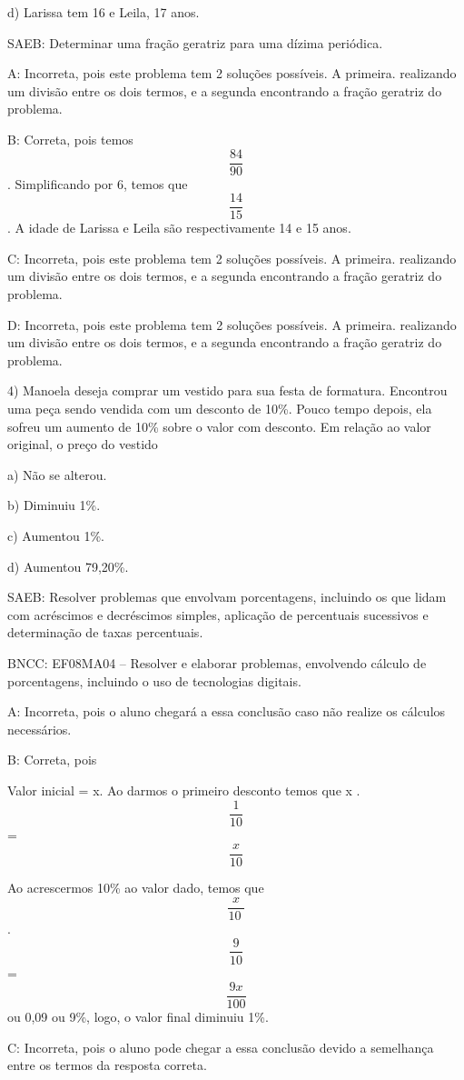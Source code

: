 d) Larissa tem 16 e Leila, 17 anos.

SAEB: Determinar uma fração geratriz para uma dízima periódica.

A: Incorreta, pois este problema tem 2 soluções possíveis. A primeira.
realizando um divisão entre os dois termos, e a segunda encontrando a
fração geratriz do problema.

B: Correta, pois temos \[\frac{84}{90}\]. Simplificando por 6, temos que
\[\frac{14}{15}\]. A idade de Larissa e Leila são respectivamente 14 e
15 anos.

C: Incorreta, pois este problema tem 2 soluções possíveis. A primeira.
realizando um divisão entre os dois termos, e a segunda encontrando a
fração geratriz do problema.

D: Incorreta, pois este problema tem 2 soluções possíveis. A primeira.
realizando um divisão entre os dois termos, e a segunda encontrando a
fração geratriz do problema.

4) Manoela deseja comprar um vestido para sua festa de formatura.
Encontrou uma peça sendo vendida com um desconto de 10\%. Pouco tempo
depois, ela sofreu um aumento de 10\% sobre o valor com desconto. Em
relação ao valor original, o preço do vestido

a) Não se alterou.

b) Diminuiu 1\%.

c) Aumentou 1\%.

d) Aumentou 79,20\%.

SAEB: Resolver problemas que envolvam porcentagens, incluindo os que
lidam com acréscimos e decréscimos simples, aplicação de percentuais
sucessivos e determinação de taxas percentuais.

BNCC: EF08MA04 -- Resolver e elaborar problemas, envolvendo cálculo de
porcentagens, incluindo o uso de tecnologias digitais.

A: Incorreta, pois o aluno chegará a essa conclusão caso não realize os
cálculos necessários.

B: Correta, pois

Valor inicial = x. Ao darmos o primeiro desconto temos que x .
\[\frac{1}{10}\] = \[\frac{x}{10}\]

Ao acrescermos 10\% ao valor dado, temos que \[\frac{x}{10\ }\] .
\[\frac{9}{10}\] = \[\frac{9x}{100}\] ou 0,09 ou 9\%, logo, o valor
final diminuiu 1\%.

C: Incorreta, pois o aluno pode chegar a essa conclusão devido a
semelhança entre os termos da resposta correta.

